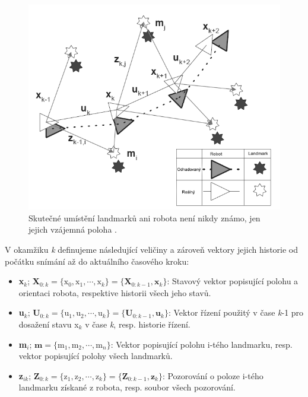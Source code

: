 \documentclass[12pt,a4paper]{article}
\begin{document}
\begin{figure}[H]
\centering
\includegraphics[scale=0.6]{img/Obr2_b}
\caption{Skutečné umístění landmarků ani robota není nikdy známo, jen jejich vzájemná poloha \cite{Durrant-Whyte}.}
\end{figure}

V okamžiku \textit{k} definujeme následující veličiny a zároveň vektory jejich historie od počátku snímání až do aktuálního časového kroku:
\begin{itemize}
\item \textbf{x}$_k$; \textbf{X}$_{0:k}=\lbrace \text{x}_0, \text{x}_1,\cdots, \text{x}_k\rbrace = \lbrace \textbf{X}_{0:k-1}, \textbf{x}_k \rbrace$:  
Stavový vektor popisující polohu a orientaci robota, respektive  historii všech jeho stavů.
\item \textbf{u}$_k$; \textbf{U}$_{0:k}=\lbrace \text{u}_1, \text{u}_2,\cdots, \text{u}_k\rbrace = \lbrace \textbf{U}_{0:k-1}, \textbf{u}_k \rbrace$: 
Vektor řízení použitý v čase \textit{k}-1 pro dosažení stavu x$_k$ v čase \textit{k}, resp. historie řízení.
\item \textbf{m}$_i$; $\textbf{m}=\lbrace \text{m}_1, \text{m}_2,\cdots, \text{m}_n\rbrace$: 
Vektor popisující polohu i-tého landmarku, resp. vektor popisující polohy všech landmarků.
\item \textbf{z}$_{ik}$; \textbf{Z}$_{0:k}=\lbrace \text{z}_1, \text{z}_2,\cdots, \text{z}_k\rbrace = \lbrace \textbf{Z}_{0:k-1}, \textbf{z}_k \rbrace$: 
Pozorování o poloze i-tého landmarku získané z robota, resp. soubor všech pozorování.
\end{itemize}
\end{document}
